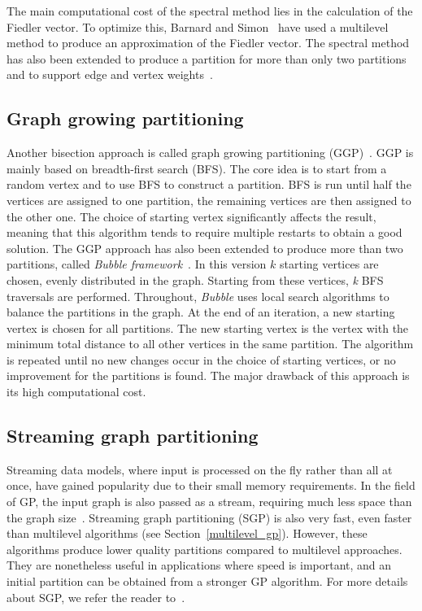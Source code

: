 The main computational cost of the spectral method lies in the calculation of the Fiedler vector. To optimize this, Barnard and Simon~\cite{barnard_spectral_bisection} have used a multilevel method to produce an approximation of the Fiedler vector. The spectral method has also been extended to produce a partition for more than only two partitions and to support edge and vertex weights~\cite{hendrickson_multilevel_1995}.

\subsection{Graph growing partitioning} \label{graph_growing}
Another bisection approach is called graph growing partitioning (GGP)~\cite{KarypisGeorge1998AFaH}. GGP is mainly based on breadth-first search (BFS). The core idea is to start from a random vertex and to use BFS to construct a partition. BFS is run until half the vertices are assigned to one partition, the remaining vertices are then assigned to the other one. The choice of starting vertex significantly affects the result, meaning that this algorithm tends to require multiple restarts to obtain a good solution. The GGP approach has also been extended to produce more than two partitions, called \textit{Bubble framework}~\cite{DIEKMANN20001555}. In this version $k$ starting vertices are chosen, evenly distributed in the graph. Starting from these vertices, \textit{k} BFS traversals are performed. Throughout, \textit{Bubble} uses local search algorithms to balance the partitions in the graph. At the end of an iteration, a new starting vertex is chosen for all partitions. The new starting vertex is the vertex with the minimum total distance to all other vertices in the same partition. The algorithm is repeated until no new changes occur in the choice of starting vertices, or no improvement for the partitions is found. The major drawback of this approach is its high computational cost.

\subsection{Streaming graph partitioning}
Streaming data models, where input is processed on the fly rather than all at once, have gained popularity due to their small memory requirements. In the field of GP, the input graph is also passed as a stream, requiring much less space than the graph size~\cite{buluc_recent_2016}. Streaming graph partitioning (SGP) is also very fast, even faster than multilevel algorithms (see Section~\ref{multilevel_gp}). However, these algorithms produce lower quality partitions compared to multilevel approaches. They are nonetheless useful in applications where speed is important, and an initial partition can be obtained from a stronger GP algorithm. For more details about SGP, we refer the reader to~\cite{stanton_streaming_gpp, tsourakakis_fennel, nishimura_streaming_gp}.

